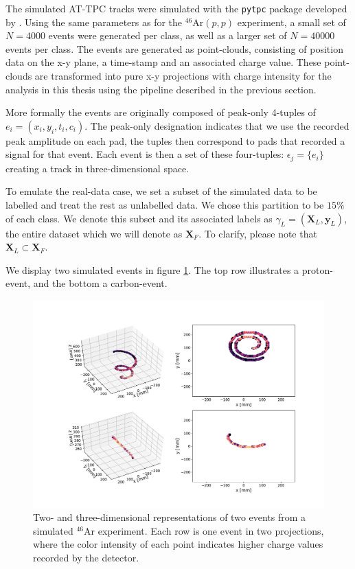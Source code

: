 The simulated AT-TPC tracks were simulated with the \lstinline{pytpc} package developed by \citet{Bradt2017a}. Using the same parameters as for the ${}^{46}$Ar$(p, p)$ experiment, a small set of $N=4000$ events were generated per class, as well as a larger set of $N=40000$ events per class. The events are generated as point-clouds, consisting of position data on the x-y plane, a time-stamp and an associated charge value. These point-clouds are transformed into pure x-y projections with charge intensity for the analysis in this thesis using the pipeline described in the previous section. 

More formally the events are originally composed of peak-only 4-tuples of $e_i = (x_i, y_i, t_i, c_i)$. The peak-only designation indicates that we use the recorded peak amplitude on each pad, the tuples then correspond to pads that recorded a signal for that event. Each event is then a set of these four-tuples: $\epsilon_j = \{e_i\}$ creating a track in three-dimensional space. 

To emulate the real-data case, we set a subset of the simulated data to be labelled and treat the rest as unlabelled data. We chose this partition to be $15\%$ of each class. We denote this subset and its associated labels as $\gamma_L=(\boldsymbol{X}_L, \boldsymbol{y}_L)$, the entire dataset which we will denote as $\boldsymbol{X}_F$. To clarify, please note that $\boldsymbol{X}_L \subset \boldsymbol{X}_F$.

We display two simulated events in figure \ref{fig:sim_samples}. The top row illustrates a proton-event, and the bottom a carbon-event. 

\begin{figure}[ht]
\centering
\includegraphics[width=\textwidth]{../plots/display_eventssimulated.pdf}
\caption[Displaying simulated events in 2D and 3D]{Two- and three-dimensional representations of two events from a simulated ${}^{46}$Ar experiment. Each row is one event in two projections, where the color intensity of each point indicates higher charge values recorded by the detector.}\label{fig:sim_samples}
\end{figure}


